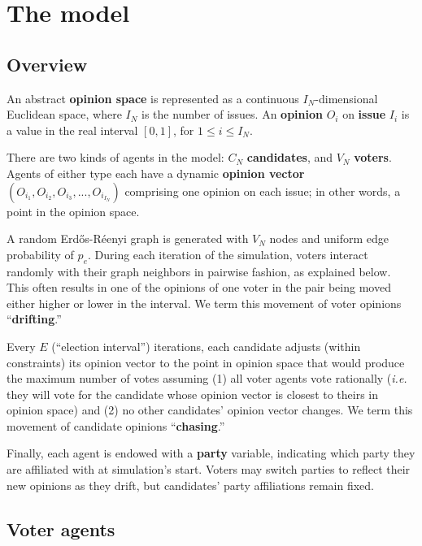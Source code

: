 \section{The model}
\label{sec:model}

\subsection{Overview}

An abstract \textbf{opinion space} is represented as a continuous
$I_N$-dimensional Euclidean space, where $I_N$ is the number of issues. An
\textbf{opinion} $O_i$ on \textbf{issue} $I_i$ is a value in the real interval
$[0,1]$, for $1 \leq i \leq I_N$.

There are two kinds of agents in the model: $C_N$ \textbf{candidates}, and
$V_N$ \textbf{voters}. Agents of either type each have a dynamic
\textbf{opinion vector} $(O_{i_1}, O_{i_2}, O_{i_3}, ..., O_{i_{I_N}})$
comprising one opinion on each issue; in other words, a point in the opinion
space.

A random Erd\H{o}s-R\'{e}enyi graph\cite{erdhos_evolution_1960} is generated
with $V_N$ nodes and uniform edge probability of $p_e$. During each iteration
of the simulation, voters interact randomly with their graph neighbors in
pairwise fashion, as explained below. This often results in one of the opinions
of one voter in the pair being moved either higher or lower in the interval.
We term this movement of voter opinions ``\textbf{drifting}.''

Every $E$ (``election interval'') iterations, each candidate adjusts (within
constraints) its opinion vector to the point in opinion space that would
produce the maximum number of votes assuming (1) all voter agents vote
rationally (\textit{i.e.} they will vote for the candidate whose opinion vector
is closest to theirs in opinion space) and (2) no other candidates' opinion
vector changes. We term this movement of candidate opinions
``\textbf{chasing}.''

Finally, each agent is endowed with a \textbf{party} variable, indicating which
party they are affiliated with at simulation's start. Voters may switch parties 
to reflect their new opinions as they drift, but candidates' party affiliations
remain fixed.

\subsection{Voter agents}


